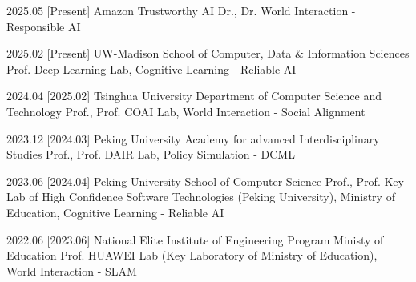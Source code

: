 \documentclass[zh]{resume}
\begin{document}

\begin{educations}
  \education%
    {2025.05}%
    [Present]%
    {Amazon}%
    {Trustworthy AI} 
    {Dr., Dr.}%
    {World Interaction - Responsible AI}%
  
  \separator{0.5ex}
  \education%
    {2025.02}%
    [Present]%
    {UW-Madison}%
    {School of Computer, Data \& Information Sciences} 
    {Prof.}%
    {Deep Learning Lab, Cognitive Learning - Reliable AI}%
  
  \separator{0.5ex}
  \education%
    {2024.04}%
    [2025.02]%
    {Tsinghua University}%
    {Department of Computer Science and Technology} 
    {Prof., Prof.}%
    {COAI Lab, World Interaction - Social Alignment}%
  
  \separator{0.5ex}
  \education%
    {2023.12}%
    [2024.03]%
    {Peking University}%
    {Academy for advanced Interdisciplinary Studies}%
    {Prof., Prof.}%
    {DAIR Lab, Policy Simulation - DCML}

  \separator{0.5ex}  
  \education%
    {2023.06}%
    [2024.04]%
    {Peking University}%
    {School of Computer Science}%
    {Prof.,  Prof.}%
    {Key Lab of High Confidence Software Technologies (Peking University), Ministry of Education, Cognitive Learning - Reliable AI}  

  \separator{0.5ex}  
  \education%
    {2022.06}%
    [2023.06]%
    {National Elite Institute of Engineering Program}%
    {Ministy of Education}
    {Prof.}%
    {HUAWEI Lab (Key Laboratory of Ministry of Education), World Interaction - SLAM}%
    
\end{educations}
\end{document}
